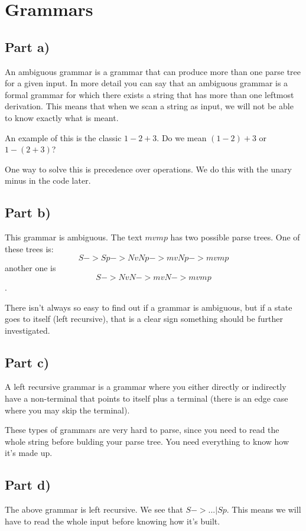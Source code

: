 \documentclass[paper=a4, fontsize=11pt]{scrartcl} %
\numberwithin{equation}{section} %
\numberwithin{figure}{section} %
\numberwithin{table}{section} %
\begin{document}
\section{Grammars}

\subsection{Part a)}
An ambiguous grammar is a grammar that can produce more than one parse tree for a given input. In more detail you can say that an ambiguous grammar is a formal grammar for which there exists a string that has more than one leftmost derivation. This means that when we scan a string as input, we will not be able to know exactly what is meant.

An example of this is the classic $1-2+3$. Do we mean $(1-2)+3$ or $1-(2+3)$?

One way to solve this is precedence over operations. We do this with the unary minus in the code later.

\subsection{Part b)}
This grammar is ambiguous. The text $mvmp$ has two possible parse trees. One of these trees is: $$S -> Sp -> NvNp -> mvNp -> mvmp$$ another one is $$S -> NvN -> mvN -> mvmp$$ .

There isn't always so easy to find out if a grammar is ambiguous, but if a state goes to itself (left recursive), that is a clear sign something should be further investigated.

\subsection{Part c)}
A left recursive grammar is a grammar where you either directly or indirectly have a non-terminal that points to itself plus a terminal (there is an edge case where you may skip the terminal).

These types of grammars are very hard to parse, since you need to read the whole string before bulding your parse tree. You need everything to know how it's made up.

\subsection{Part d)}
The above grammar is left recursive. We see that $S -> ... | Sp$. This means we will have to read the whole input before knowing how it's built.

\end{document}
